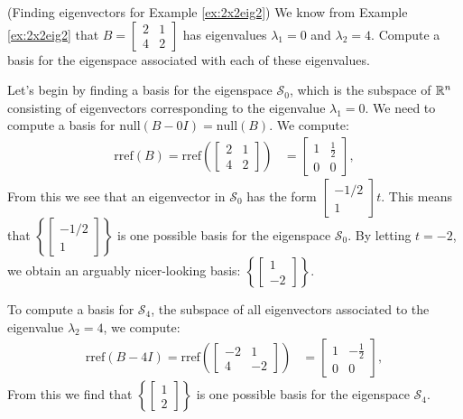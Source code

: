 \documentclass{ximera}
\begin{document}
\begin{example} (Finding eigenvectors for Example \ref{ex:2x2eig2}) 
We know from Example \ref{ex:2x2eig2} that $B=\begin{bmatrix} 2& 1\\ 4&2
\end{bmatrix}$ has eigenvalues $\lambda_1=0$ and $\lambda_2=4$.  Compute a basis for the eigenspace associated with each of these eigenvalues.
\begin{explanation}
Let's begin by finding a basis for the eigenspace $\mathcal{S}_0$, which is the subspace of $\mathbb{R}^n$ consisting of eigenvectors corresponding to the eigenvalue $\lambda_1=0$.  We need to compute a basis for $\mbox{null}(B-0I) = \mbox{null}(B)$.  We compute:
\begin{align*}\mbox{rref}(B)=\mbox{rref}\left(\begin{bmatrix}2&1\\4&2\end{bmatrix}\right)&=\begin{bmatrix}1&\frac{1}{2}\\0&0\end{bmatrix},
\end{align*}
From this we see that an eigenvector in $\mathcal{S}_0$ has the form $\begin{bmatrix}-1/2\\1\end{bmatrix}t$. %
This means that $\left\{\begin{bmatrix}-1/2\\1\end{bmatrix}\right\}$ is one possible basis for the eigenspace $\mathcal{S}_0$.  By letting $t=-2$, we obtain an arguably nicer-looking basis: $\left\{\begin{bmatrix}1\\-2\end{bmatrix}\right\}$. 

To compute a basis for $\mathcal{S}_4$, the subspace of all eigenvectors associated to the eigenvalue $\lambda_2=4$, we compute:
\begin{align*}\mbox{rref}(B-4I)=\mbox{rref}\left(\begin{bmatrix}-2&1\\4&-2\end{bmatrix}\right)&=\begin{bmatrix}1&-\frac{1}{2}\\0&0\end{bmatrix},
\end{align*}
From this we find that $\left\{\begin{bmatrix}1\\2\end{bmatrix}\right\}$ is one possible basis for the eigenspace $\mathcal{S}_4$.
\end{explanation}
\end{example}
\end{document}
